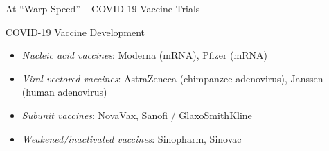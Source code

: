 \documentclass{beamer}
\begin{document}

\begin{frame}[standout]
  At ``Warp Speed'' -- COVID-19 Vaccine Trials
\end{frame}


\begin{frame}[c]{COVID-19 Vaccine Development}

\begin{center}
\begin{itemize}
  \itemsep10pt
  \item \textit{Nucleic acid vaccines}: Moderna (mRNA), Pfizer (mRNA)
  \item \textit{Viral-vectored vaccines}: AstraZeneca (chimpanzee adenovirus),
     Janssen (human adenovirus)
  \item \textit{Subunit vaccines}: NovaVax, Sanofi / GlaxoSmithKline
  \item \textit{Weakened/inactivated vaccines}: Sinopharm, Sinovac
\end{itemize}
\end{center}


\end{frame}

\end{document}

